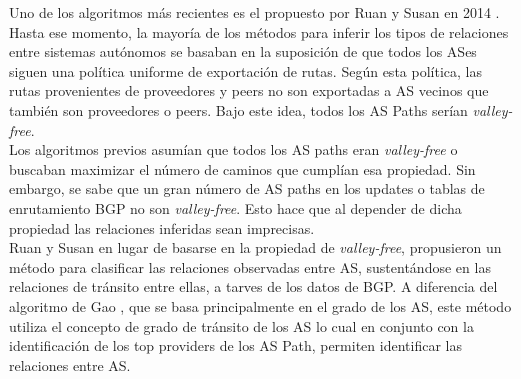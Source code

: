 Uno de los algoritmos más recientes es el propuesto por Ruan y Susan en 2014 \cite{computing-observed-autonomous-system-relationships-in-the-internet}. Hasta ese momento, la mayoría de los métodos para inferir los tipos de relaciones entre sistemas autónomos se basaban en la suposición de que todos los ASes siguen una política uniforme de exportación de rutas. Según esta política, las rutas provenientes de proveedores y peers no son exportadas a AS vecinos que también son proveedores o peers. Bajo este idea, todos los AS Paths serían \textit{valley-free}. \\

Los algoritmos previos asumían que todos los AS paths eran \textit{valley-free} o buscaban maximizar el número de caminos que cumplían esa propiedad. Sin embargo, se sabe que un gran número de AS paths en los updates  o tablas de enrutamiento BGP no son \textit{valley-free}. Esto hace que al depender de dicha propiedad las relaciones inferidas sean imprecisas.\\

Ruan y Susan en lugar de basarse en la propiedad de \textit{valley-free}, propusieron un método para clasificar las relaciones observadas entre AS, sustentándose en las relaciones de tránsito entre ellas, a tarves de los datos de BGP. A diferencia del algoritmo de Gao \cite{InferringASRelatioships2001}, que se basa principalmente en el grado de los AS, este método utiliza el concepto de grado de tránsito de los AS lo cual en conjunto con la identificación de los top providers de los AS Path, permiten identificar las relaciones entre AS.\\

